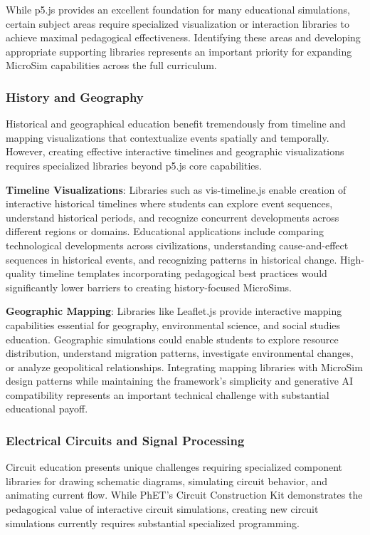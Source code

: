 While p5.js provides an excellent foundation for many educational simulations, certain subject areas require specialized visualization or interaction libraries to achieve maximal pedagogical effectiveness. Identifying these areas and developing appropriate supporting libraries represents an important priority for expanding MicroSim capabilities across the full curriculum.

\subsubsection{History and Geography}

Historical and geographical education benefit tremendously from timeline and mapping visualizations that contextualize events spatially and temporally. However, creating effective interactive timelines and geographic visualizations requires specialized libraries beyond p5.js core capabilities.

\textbf{Timeline Visualizations}: Libraries such as vis-timeline.js enable creation of interactive historical timelines where students can explore event sequences, understand historical periods, and recognize concurrent developments across different regions or domains. Educational applications include comparing technological developments across civilizations, understanding cause-and-effect sequences in historical events, and recognizing patterns in historical change. High-quality timeline templates incorporating pedagogical best practices would significantly lower barriers to creating history-focused MicroSims.

\textbf{Geographic Mapping}: Libraries like Leaflet.js provide interactive mapping capabilities essential for geography, environmental science, and social studies education. Geographic simulations could enable students to explore resource distribution, understand migration patterns, investigate environmental changes, or analyze geopolitical relationships. Integrating mapping libraries with MicroSim design patterns while maintaining the framework's simplicity and generative AI compatibility represents an important technical challenge with substantial educational payoff.

\subsubsection{Electrical Circuits and Signal Processing}

Circuit education presents unique challenges requiring specialized component libraries for drawing schematic diagrams, simulating circuit behavior, and animating current flow. While PhET's Circuit Construction Kit demonstrates the pedagogical value of interactive circuit simulations, creating new circuit simulations currently requires substantial specialized programming.

